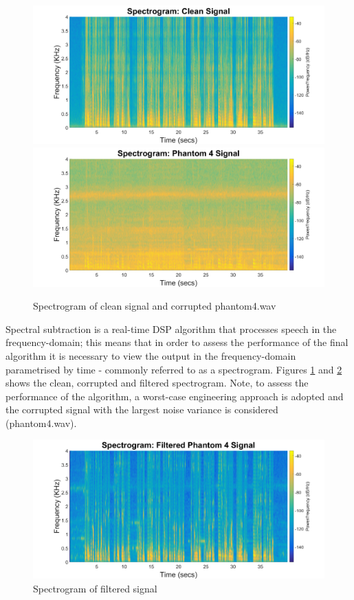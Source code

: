 \documentclass[a4paper,pra,twocolumn,10pt,aps,longbibliography,nobalancelastpage]{revtex4-1}
\begin{document}
\begin{figure}[H]
    \includegraphics[width=\columnwidth]{final_clean}
    \includegraphics[width=\columnwidth]{final_ph4}
    \caption{Spectrogram of clean signal and corrupted phantom4.wav}
    \label{fig:clean}
\end{figure}

Spectral subtraction is a real-time DSP algorithm that processes speech in the frequency-domain; this means that in order to assess the performance of the final algorithm it is necessary to view the output in the frequency-domain parametrised by time - commonly referred to as a spectrogram. Figures \ref{fig:clean} and \ref{fig:dirty} shows the clean, corrupted and filtered spectrogram. Note, to assess the performance of the algorithm, a worst-case engineering approach is adopted and the corrupted signal with the largest noise variance is considered (phantom4.wav). 

\begin{figure}[H]
    \includegraphics[width=\columnwidth]{final_ph4_filtered}
    \caption{Spectrogram of filtered signal}
    \label{fig:dirty}
\end{figure}
\end{document}
